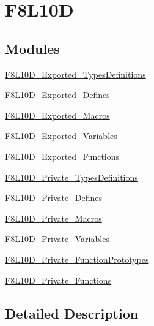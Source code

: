 \hypertarget{group___f8_l10_d}{}\section{F8\+L10D}
\label{group___f8_l10_d}
\subsection*{Modules}
\begin{DoxyCompactItemize}
\item 
\mbox{\hyperlink{group___f8_l10_d___exported___types_definitions}{F8\+L10\+D\+\_\+\+Exported\+\_\+\+Types\+Definitions}}
\item 
\mbox{\hyperlink{group___f8_l10_d___exported___defines}{F8\+L10\+D\+\_\+\+Exported\+\_\+\+Defines}}
\item 
\mbox{\hyperlink{group___f8_l10_d___exported___macros}{F8\+L10\+D\+\_\+\+Exported\+\_\+\+Macros}}
\item 
\mbox{\hyperlink{group___f8_l10_d___exported___variables}{F8\+L10\+D\+\_\+\+Exported\+\_\+\+Variables}}
\item 
\mbox{\hyperlink{group___f8_l10_d___exported___functions}{F8\+L10\+D\+\_\+\+Exported\+\_\+\+Functions}}
\item 
\mbox{\hyperlink{group___f8_l10_d___private___types_definitions}{F8\+L10\+D\+\_\+\+Private\+\_\+\+Types\+Definitions}}
\item 
\mbox{\hyperlink{group___f8_l10_d___private___defines}{F8\+L10\+D\+\_\+\+Private\+\_\+\+Defines}}
\item 
\mbox{\hyperlink{group___f8_l10_d___private___macros}{F8\+L10\+D\+\_\+\+Private\+\_\+\+Macros}}
\item 
\mbox{\hyperlink{group___f8_l10_d___private___variables}{F8\+L10\+D\+\_\+\+Private\+\_\+\+Variables}}
\item 
\mbox{\hyperlink{group___f8_l10_d___private___function_prototypes}{F8\+L10\+D\+\_\+\+Private\+\_\+\+Function\+Prototypes}}
\item 
\mbox{\hyperlink{group___f8_l10_d___private___functions}{F8\+L10\+D\+\_\+\+Private\+\_\+\+Functions}}
\end{DoxyCompactItemize}


\subsection{Detailed Description}
